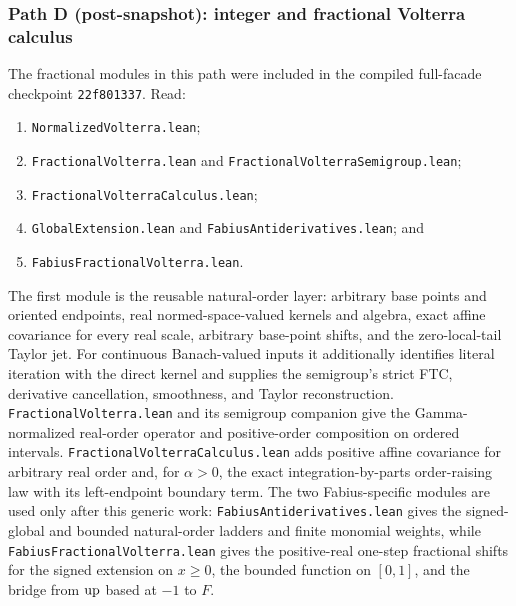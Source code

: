 \documentclass[11pt,oneside]{article}
\theoremstyle{definition}
\theoremstyle{remark}
\begin{document}
\subsubsection{Path D (post-snapshot): integer and fractional Volterra calculus}
The fractional modules in this path were included in the compiled full-facade
checkpoint \nolinkurl{22f801337}.
Read:
\begin{enumerate}
  \item \nolinkurl{NormalizedVolterra.lean};
  \item \nolinkurl{FractionalVolterra.lean} and
        \nolinkurl{FractionalVolterraSemigroup.lean};
  \item \nolinkurl{FractionalVolterraCalculus.lean};
  \item \nolinkurl{GlobalExtension.lean} and
        \nolinkurl{FabiusAntiderivatives.lean}; and
  \item \nolinkurl{FabiusFractionalVolterra.lean}.
\end{enumerate}
The first module is the reusable natural-order layer: arbitrary base points and oriented
endpoints, real normed-space-valued kernels and algebra, exact affine covariance
for every real scale, arbitrary base-point shifts, and the zero-local-tail Taylor
jet.  For continuous Banach-valued inputs it additionally identifies literal
iteration with the direct kernel and supplies the semigroup's strict FTC,
derivative cancellation, smoothness, and Taylor reconstruction.
\nolinkurl{FractionalVolterra.lean} and its semigroup companion give the
Gamma-normalized real-order operator and positive-order composition on ordered
intervals.  \nolinkurl{FractionalVolterraCalculus.lean} adds positive affine
covariance for arbitrary real order and, for \(\alpha>0\), the exact
integration-by-parts order-raising law with its left-endpoint boundary term.
The two Fabius-specific modules are used only after this generic work:
\nolinkurl{FabiusAntiderivatives.lean} gives the signed-global and bounded
natural-order ladders and finite monomial weights, while
\nolinkurl{FabiusFractionalVolterra.lean} gives the positive-real one-step
fractional shifts for the signed extension on \(x\geq0\), the bounded function
on \([0,1]\), and the bridge from \(\operatorname{up}\) based at \(-1\) to \(F\).
\end{document}
